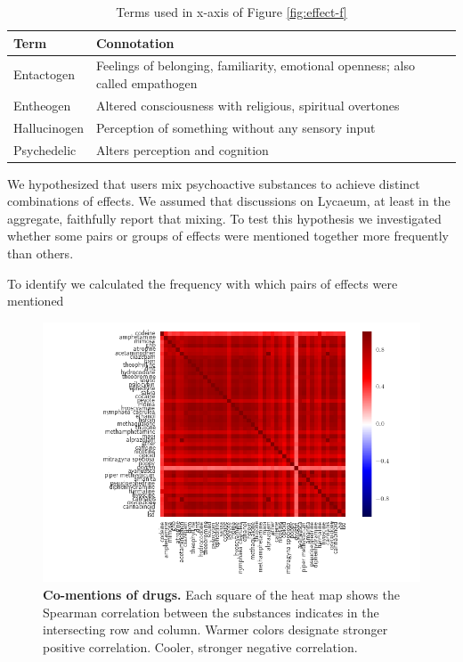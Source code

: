 \documentclass{article}
\begin{document}
\begin{table}[h]
\centering
\begin{tabular}{@{}ll@{}}
\toprule
Term         & Connotation                                                                    \\ \midrule
Entactogen   & Feelings of belonging, familiarity, emotional openness; also called empathogen \\
Entheogen    & Altered consciousness with religious, spiritual overtones                      \\
Hallucinogen & Perception of something without any sensory input                              \\
Psychedelic  & Alters perception and cognition                                                \\ \bottomrule
\end{tabular}
\caption{Terms used in x-axis of Figure \ref{fig:effect-f}}
\label{tab:effect-defs}
\end{table}

   We hypothesized that users mix psychoactive substances to achieve distinct combinations of effects. We assumed that discussions on Lycaeum, at least in the aggregate, faithfully report that mixing. To test this hypothesis we investigated whether some pairs or groups of effects were mentioned together more frequently than others.
   
     To identify  we calculated the frequency with which pairs of effects were mentioned 
   
   


\begin{figure}[h]
\centering
\includegraphics[scale=0.65]{drug-correlation-matrix.png}
\caption{\textbf{Co-mentions of drugs.} Each square of the heat map shows the Spearman correlation between the substances indicates in the intersecting row and column. Warmer colors designate stronger positive correlation. Cooler, stronger negative correlation. }
\label{fig:drug-drug-correlation}
\end{figure}
\end{document}
